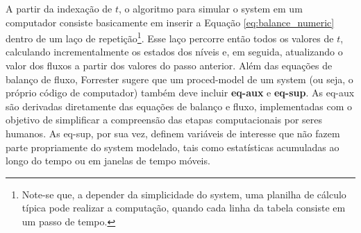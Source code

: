 \documentclass[./main.tex]{subfiles}
\begin{document}
A partir da indexação de $t$, o algoritmo para simular o \gls{system} em um computador consiste basicamente em inserir a Equação \eqref{eq:balance_numeric} dentro de um laço de repetição\footnote{Note-se que, a depender da simplicidade do \gls{system}, uma planilha de cálculo típica pode realizar a computação, quando cada linha da tabela consiste em um passo de tempo.}. Esse laço percorre então todos os valores de $t$, calculando incrementalmente os estados dos níveis e, em seguida, atualizando o valor dos fluxos a partir dos valores do passo anterior. Além das equações de balanço de fluxo, Forrester sugere que um \gls{proced-model} de um \gls{system} (ou seja, o próprio código de computador) também deve incluir \textbf{\gls{eq-aux}} e \textbf{\gls{eq-sup}}. As \gls{eq-aux} são derivadas diretamente das equações de balanço e fluxo, implementadas com o objetivo de simplificar a compreensão das etapas computacionais por seres humanos. As \gls{eq-sup}, por sua vez, definem variáveis de interesse que não fazem parte propriamente do \gls{system} modelado, tais como estatísticas acumuladas ao longo do tempo ou em janelas de tempo móveis.
\end{document}
